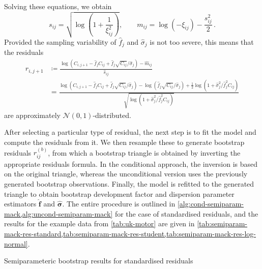 \documentclass[a4paper]{book}
\begin{document}
Solving these equations, we obtain
\begin{equation}
  s_{ij} = \sqrt{\log \left( 1 + \frac{1}{\xi^2_{ij}} \right)}, \qquad m_{ij} = \log(-\xi_{ij}) - \frac{s^2_{ij}}{2} \,.
\end{equation}
Provided the sampling variability of $\widehat{f}_j$ and $\widehat{\sigma}_j$ is not too severe, this means that the residuals
\begin{align} \label{eq:log-normal-resids}
  r_{i, j + 1}
   & \coloneqq \frac{\log \left( C_{i, j + 1} - \widehat{f}_j C_{ij} + \widehat{f}_j \sqrt{C_{ij}} / \widehat{\sigma}_j \right) - \widehat{m}_{ij}}{\widehat{s}_{ij}}                                                                                                                                                                               \\
   & = \frac{\log \left( C_{i, j + 1} - \widehat{f}_j C_{ij} + \widehat{f}_j \sqrt{C_{ij}} / \widehat{\sigma}_j \right) - \log(\widehat{f}_j \sqrt{C_{ij}} / \widehat{\sigma}_j) + \frac{1}{2} \log \left( 1 + \widehat{\sigma}^2_j / \widehat{f}^2_j C_{ij} \right)}{\sqrt{\log \left( 1 + \widehat{\sigma}^2_j / \widehat{f}^2_j C_{ij} \right)}}
\end{align}
are approximately $\mathcal{N}(0, 1)$-distributed.

After selecting a particular type of residual, the next step is to fit the model and compute the residuals from it. We then resample these to generate bootstrap residuals $r^{(b)}_{ij}$, from which a bootstrap triangle is obtained by inverting the appropriate residuals formula. In the conditional approach, the inversion is based on the original triangle, whereas the unconditional version uses the previously generated bootstrap observations. Finally, the model is refitted to the generated triangle to obtain bootstrap development factor and dispersion parameter estimators $\widehat{\bm{f}}$ and $\widehat{\bm{\sigma}}$. The entire procedure is outlined in \cref{alg:cond-semiparam-mack,alg:uncond-semiparam-mack} for the case of standardised residuals, and the results for the example data from \cref{tab:uk-motor} are given in \cref{tab:semiparam-mack-res-standard,tab:semiparam-mack-res-student,tab:semiparam-mack-res-log-normal}.

\begin{table}[!htb]
  \begin{subtable}{0.5\linewidth}
    
  \end{subtable}
  \hfill
  \begin{subtable}{0.5\linewidth}
    
  \end{subtable}
  \caption{Semiparameteric bootstrap results for standardised residuals}
  \label{tab:semiparam-mack-res-standard}
\end{table}
\end{document}
